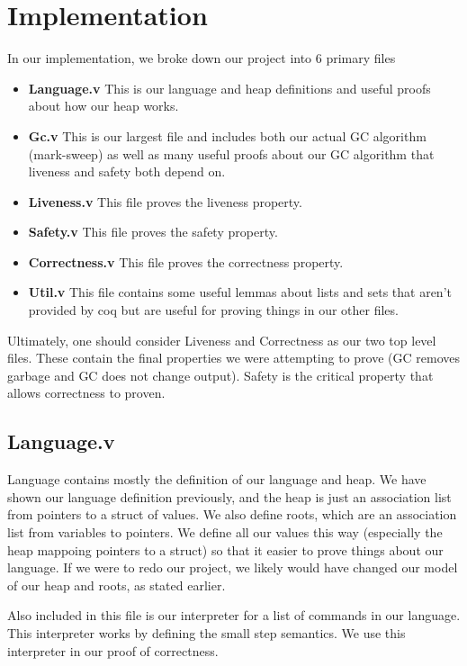\documentclass{article}
\begin{document}
\section{Implementation}
In our implementation, we broke down our project into 6 primary files
\begin{itemize}
    \item \textbf{Language.v} This is our language and heap definitions and useful proofs about how our heap works.
    \item \textbf{Gc.v} This is our largest file and includes both our actual GC algorithm (mark-sweep) as well as many useful proofs about our GC algorithm that liveness and safety both depend on.
    \item \textbf{Liveness.v} This file proves the liveness property.
    \item \textbf{Safety.v} This file proves the safety property.
    \item \textbf{Correctness.v} This file proves the correctness property.
    \item \textbf{Util.v} This file contains some useful lemmas about lists and sets that aren't provided by coq but are useful for proving things in our other files.
\end{itemize}

Ultimately, one should consider Liveness and Correctness as our two top level files. These contain the final properties we were attempting to prove (GC removes garbage and GC does not change output). Safety is the critical property that allows correctness to proven.

\subsection{Language.v}
Language contains mostly the definition of our language and heap. We have shown our language definition previously, and the heap is just an association list from pointers to a struct of values. We also define roots, which are an association list from variables to pointers. We define all our values this way (especially the heap mappoing pointers to a struct) so that it easier to prove things about our language. If we were to redo our project, we likely would have changed our model of our heap and roots, as stated earlier.

Also included in this file is our interpreter for a list of commands in our language. This interpreter works by defining the small step semantics. We use this interpreter in our proof of correctness.
\end{document}

